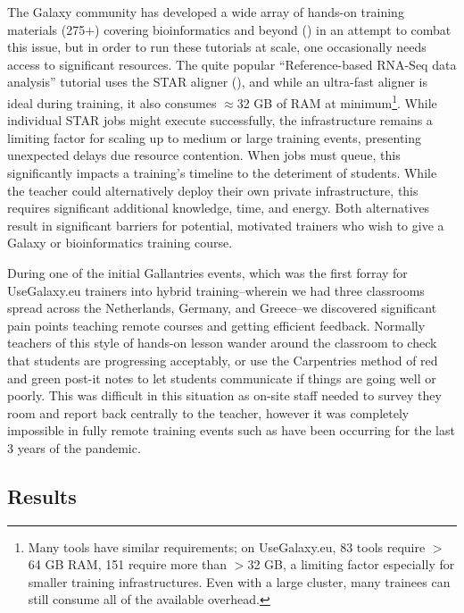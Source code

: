 \documentclass[a4paper,num-refs]{oup-contemporary}
\begin{document}
The Galaxy community has developed a wide array of hands-on training materials (275+) covering bioinformatics and beyond (\cite{training-site}) in an attempt to combat this issue, but in order to run these tutorials at scale, one occasionally needs access to significant resources. The quite popular ``Reference-based RNA-Seq data analysis'' tutorial uses the STAR aligner (\cite{Dobin2012}), and while an ultra-fast aligner is ideal during training, it also consumes $\approx$32 GB of RAM at minimum\footnote{Many tools have similar requirements; on UseGalaxy.eu, 83 tools require $>$64 GB RAM, 151 require more than $>$32 GB, a limiting factor especially for smaller training infrastructures. Even with a large cluster, many trainees can still consume all of the available overhead.}. While individual STAR jobs might execute successfully, the infrastructure remains a limiting factor for scaling up to medium or large training events, presenting unexpected delays due resource contention. When jobs must queue, this significantly impacts a training's timeline to the deteriment of students. While the teacher could alternatively deploy their own private infrastructure, this requires significant additional knowledge, time, and energy. Both alternatives result in significant barriers for potential, motivated trainers who wish to give a Galaxy or bioinformatics training course.

During one of the initial Gallantries events, which was the first forray for UseGalaxy.eu trainers into hybrid training--wherein we had three classrooms spread across the Netherlands, Germany, and Greece--we discovered significant pain points teaching remote courses and getting efficient feedback. Normally teachers of this style of hands-on lesson wander around the classroom to check that students are progressing acceptably, or use the Carpentries method of red and green post-it notes to let students communicate if things are going well or poorly. This was difficult in this situation as on-site staff needed to survey they room and report back centrally to the teacher, however it was completely impossible in fully remote training events such as have been occurring for the last 3 years of the pandemic.

\subsection{Results}
\end{document}

